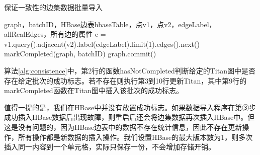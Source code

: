 \begin{algorithm}
\caption{保证一致性的边集数据批量导入}
\label{alg:consistence}
\begin{algorithmic}[1] %
\REQUIRE graph，batchID，HBase边表hbaseTable，点v1，点v2，edgeLabel，allRealEdges，所有边的属性
\STATE e = v1.query().adjacent(v2).label(edgeLabel).limit(1).edges().next()
	\ENDIF
	\ENDFOR
	\STATE markCompleted(graph, batchID)
	\STATE graph.commit()
\ENDIF
{}
\ENDFOR
\end{algorithmic}
\end{algorithm}

算法\ref{alg:consistence}中，第2行的函数hasNotCompleted判断给定的Titan图中是否存在给定批次的成功标志。若不存在则执行第3到10行更新Titan，其中第9行的markCompleted函数在Titan图中插入该批次的成功标志。

值得一提的是，我们在HBase中并没有放置成功标志。如果数据导入程序在第③步成功插入HBase数据后出现故障，则重启后还会将边集数据再次插入HBase中。但这是没有问题的，因为HBase边表中的数据不存在统计信息，因此不存在更新操作，所有操作都是新数据的插入操作。我们设置HBase的最大版本数为1，则多次插入同一内容到一个单元格，实际只保存一份，不会增加存储开销。


